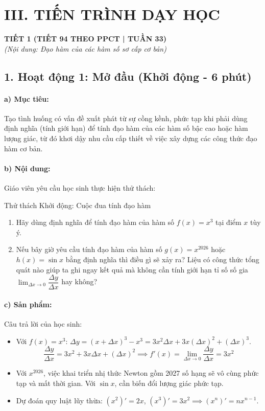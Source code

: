 \documentclass[12pt, a4paper]{article}
\begin{document}
\section*{III. TIẾN TRÌNH DẠY HỌC}

\begin{center}
    \textbf{\large TIẾT 1 (TIẾT 94 THEO PPCT | TUẦN 33)}\\[4pt]
    \textit{(Nội dung: Đạo hàm của các hàm số sơ cấp cơ bản)}
\end{center}

\subsection*{1. Hoạt động 1: Mở đầu (Khởi động - 6 phút)}

\paragraph{a) Mục tiêu:} Tạo tình huống có vấn đề xuất phát từ sự cồng kềnh, phức tạp khi phải dùng định nghĩa (tính giới hạn) để tính đạo hàm của các hàm số bậc cao hoặc hàm lượng giác, từ đó khơi dậy nhu cầu cấp thiết về việc xây dựng các công thức đạo hàm cơ bản.

\paragraph{b) Nội dung:} Giáo viên yêu cầu học sinh thực hiện thử thách:
\begin{pedabox}{Thử thách Khởi động: Cuộc đua tính đạo hàm}
\begin{enumerate}[leftmargin=0.6cm]
    \item Hãy dùng định nghĩa để tính đạo hàm của hàm số $f(x) = x^3$ tại điểm $x$ tùy ý.
    \item Nếu bây giờ yêu cầu tính đạo hàm của hàm số $g(x) = x^{2026}$ hoặc $h(x) = \sin x$ bằng định nghĩa thì điều gì sẽ xảy ra? Liệu có công thức tổng quát nào giúp ta ghi ngay kết quả mà không cần tính giới hạn tỉ số số gia $\lim_{\Delta x \to 0} \dfrac{\Delta y}{\Delta x}$ hay không?
\end{enumerate}
\end{pedabox}

\paragraph{c) Sản phẩm:} Câu trả lời của học sinh:
\begin{itemize}[leftmargin=0.8cm]
    \item Với $f(x) = x^3$: $\Delta y = (x + \Delta x)^3 - x^3 = 3x^2 \Delta x + 3x(\Delta x)^2 + (\Delta x)^3$.
    $$\dfrac{\Delta y}{\Delta x} = 3x^2 + 3x\Delta x + (\Delta x)^2 \implies f'(x) = \lim_{\Delta x \to 0} \dfrac{\Delta y}{\Delta x} = 3x^2$$
    \item Với $x^{2026}$, việc khai triển nhị thức Newton gồm 2027 số hạng sẽ vô cùng phức tạp và mất thời gian. Với $\sin x$, cần biến đổi lượng giác phức tạp.
    \item Dự đoán quy luật lũy thừa: $(x^2)' = 2x$, $(x^3)' = 3x^2 \implies (x^n)' = n x^{n-1}$.
\end{itemize}
\end{document}
